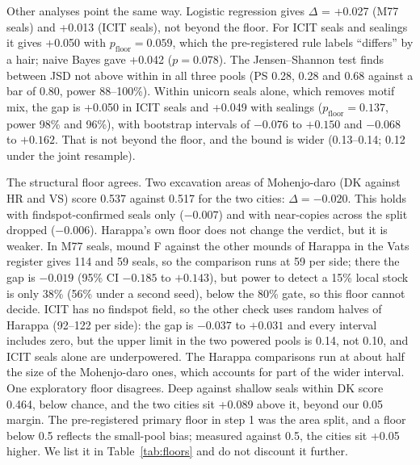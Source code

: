 \documentclass[11pt,a4paper]{article}
\begin{document}
Other analyses point the same way.
Logistic regression gives $\Delta$ = +0.027 (M77 seals) and +0.013 (ICIT seals), not beyond the floor. %
For ICIT seals and sealings it gives +0.050 with $p_{\mathrm{floor}} = 0.059$, which the pre-registered rule labels ``differs'' by a hair; naive Bayes gave +0.042 ($p = 0.078$). %
The Jensen--Shannon test finds between JSD not above within in all three pools (PS 0.28, 0.28 and 0.68 against a bar of 0.80, power 88--100\%). %
Within unicorn seals alone, which removes motif mix, the gap is +0.050 in ICIT seals and +0.049 with sealings ($p_{\mathrm{floor}} = 0.137$, power 98\% and 96\%), with bootstrap intervals of $-0.076$ to $+0.150$ and $-0.068$ to $+0.162$. %
That is not beyond the floor, and the bound is wider (0.13--0.14; 0.12 under the joint resample). %

The structural floor agrees.
Two excavation areas of Mohenjo-daro (DK against HR and VS) score 0.537 against 0.517 for the two cities: $\Delta = -0.020$. %
This holds with findspot-confirmed seals only ($-0.007$) and with near-copies across the split dropped ($-0.006$). %
Harappa's own floor does not change the verdict, but it is weaker. %
In M77 seals, mound F against the other mounds of Harappa in the Vats register gives 114 and 59 seals, so the comparison runs at 59 per side; there the gap is $-0.019$ (95\% CI $-0.185$ to $+0.143$), but power to detect a 15\% local stock is only 38\% (56\% under a second seed), below the 80\% gate, so this floor cannot decide. %
ICIT has no findspot field, so the other check uses random halves of Harappa (92--122 per side): the gap is $-0.037$ to $+0.031$ and every interval includes zero, but the upper limit in the two powered pools is 0.14, not 0.10, and ICIT seals alone are underpowered. %
The Harappa comparisons run at about half the size of the Mohenjo-daro ones, which accounts for part of the wider interval.
One exploratory floor disagrees.
Deep against shallow seals within DK score 0.464, below chance, and the two cities sit +0.089 above it, beyond our 0.05 margin. %
The pre-registered primary floor in step 1 was the area split, and a floor below 0.5 reflects the small-pool bias; measured against 0.5, the cities sit +0.05 higher. %
We list it in Table~\ref{tab:floors} and do not discount it further.
\end{document}
